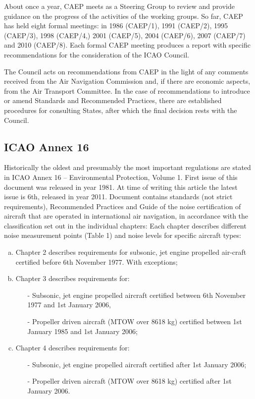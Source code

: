 About once a year, CAEP meets as a Steering Group to review and provide guidance on the progress of the activities of the working groups. So far, CAEP has held eight formal meetings: in 1986 (CAEP/1), 1991 (CAEP/2), 1995 (CAEP/3), 1998 (CAEP/4,) 2001 (CAEP/5), 2004 (CAEP/6), 2007 (CAEP/7) and 2010 (CAEP/8). Each formal CAEP meeting produces a report with specific recommendations for the consideration of the ICAO Council. 

The Council acts on recommendations from CAEP in the light of any comments received from the Air Navigation Commission and, if there are economic aspects, from the Air Transport Committee. In the case of recommendations to introduce or amend Standards and Recommended Practices, there are established procedures for consulting States, after which the final decision rests with the Council.


\subsection{ICAO Annex 16}
Historically the oldest and presumably the most important regulations are stated in ICAO Annex 16 – Environmental Protection, Volume 1. First issue of this document was released in year 1981. At time of writing this article the latest issue is 6th, released in year 2011. Document contains standards (not strict requirements), Recommended Practices and Guide of the noise certification of aircraft that are operated in international air navigation, in accordance with the classification set out in the individual chapters: Each chapter describes different noise measurement points (Table 1) and noise levels for specific aircraft types:

\begin{enumerate}[a)]
\item Chapter 2 describes requirements for subsonic, jet engine propelled air-craft certified before 6th November 1977. With exceptions;
\item Chapter 3 describes requirements for:
\begin{itemize}
\item[-] Subsonic, jet engine propelled aircraft certified between 6th November 1977 and 1st January 2006,
\item[-] Propeller driven aircraft (MTOW over 8618 kg) certified between 1st January 1985 and 1st January 2006;
\end{itemize}
\item Chapter 4 describes requirements for:
\begin{itemize}
\item[-] Subsonic, jet engine propelled aircraft certified after 1st January 2006;
\item[-] Propeller driven aircraft (MTOW over 8618 kg) certified after 1st January 2006.
\end{itemize}
\end{enumerate}

